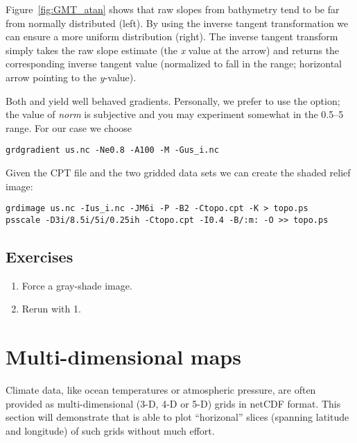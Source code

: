 \documentclass{report}
\begin{document}
Figure~\ref{fig:GMT_atan} shows that raw slopes from bathymetry tend to be
far from normally distributed (left).  By using the inverse tangent
transformation we can ensure a more uniform distribution (right).
The inverse tangent transform simply takes the raw slope estimate
(the \emph{x} value at the arrow) and returns the corresponding inverse
tangent value (normalized to fall in the  range; horizontal
arrow pointing to the \emph{y}-value).


Both  and  yield well behaved gradients.  Personally,
we prefer to use the  option; the value of
\emph{norm} is subjective and you may experiment somewhat in the
0.5--5 range.  For our case we choose

{\small\begin{verbatim}
grdgradient us.nc -Ne0.8 -A100 -M -Gus_i.nc
\end{verbatim}
}

Given the CPT file and the two gridded data sets we can
create the shaded relief image:

{\small\begin{verbatim}
grdimage us.nc -Ius_i.nc -JM6i -P -B2 -Ctopo.cpt -K > topo.ps
psscale -D3i/8.5i/5i/0.25ih -Ctopo.cpt -I0.4 -B/:m: -O >> topo.ps
\end{verbatim}
}

\subsection{Exercises}

\begin{enumerate}

\item Force a gray-shade image.

\item Rerun  with 1.

\end{enumerate}

\section{Multi-dimensional maps}

Climate data, like ocean temperatures or atmospheric pressure, are often provided as
multi-dimensional (3-D, 4-D or 5-D) grids in netCDF format. This section will demonstrate
that \GMT{} is able to plot ``horizonal''
slices (spanning latitude and longitude) of such grids without much effort.
\end{document}
